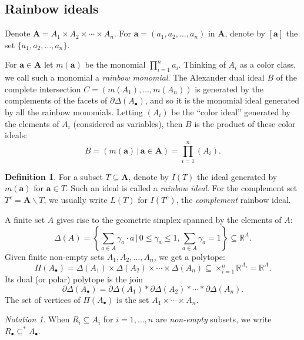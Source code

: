\documentclass[10pt,a4paper]{article}
\theoremstyle{definition}
\newtheorem{defi}[cdrthm]{Definition}
\theoremstyle{remark}
\newtheorem{nota}[cdrthm]{Notation}
\newcommand{\susst}{\subseteq^*}
\theoremstyle{plain}
\newcommand{\pd}{\partial}
\newcommand{\vardel}{\partial}
\newcommand{\sus}{\subseteq}
\newcommand{\bfa}{{\mathbf a}}
\newcommand{\RR}{{\mathbb R}}
\newcommand{\Ab}{A_\bullet}
\newcommand{\Rb}{R_\bullet}
\newcommand{\bfA}{{\mathbf A}}
\newcommand{\Delst}{\vardel \Delta}
\begin{document}
\setcounter{subsection}{1}

\subsection{Rainbow ideals}
Denote $\bfA = A_1 \times A_2 \times \cdots \times A_n$.
For $\bfa = (a_1, a_2, \ldots, a_n)$ in $\bfA$, denote
by $[\bfa ]$ the set $\{a_1, a_2, \ldots, a_n \}$. 

\setcounter{cdrthm}{1}

For $\bfa \in \bfA$ let $m(\bfa)$ be the monomial 
$\prod_{i = 1}^n a_i$. Thinking
of $A_i$ as a color class, we call such a monomial a {\it rainbow
monomial}.  The Alexander dual ideal $B$ of the complete intersection
$C = (m(A_1), \ldots, m(A_n))$ is generated by the complements
of the facets of $\Delst(\Ab)$, and so it is the monomial
ideal generated by all the  rainbow monomials. Letting
$(A_i)$ be the ``color ideal'' generated by the elements of $A_i$ (considered
as variables), then $B$ is the product of these color ideals:
\[ B  = (m(\bfa) \, | \, \bfa \in \bfA) = \prod_{i = 1}^n(A_i). \]

\begin{defi}
For a subset $T \sus \bfA$, denote by $I(T)$ the ideal generated
by $m(\bfa)$ for $\bfa \in T$. Such an ideal is called a {\it rainbow ideal}.
For the complement set $T^c = \bfA \backslash T$, we
usually write $L(T)$ for $I(T^c)$, the {\it complement} rainbow ideal.
\end{defi}

\setcounter{section}{5}\setcounter{subsection}{1}\setcounter{cdrthm}{0}\setcounter{equation}{6}\setcounter{figure}{5}

A finite set $A$ gives rise to the geometric
simplex spanned by the elements of $A$:
\[ \Delta(A) = \left\{\sum_{a \in A} \gamma_a \cdot a \, | \, 0 \leq \gamma_a \leq 1,  \sum_{a \in A} \gamma_a = 1 \right\} \sus \RR^A. \]
Given finite non-empty sets $ A_1, A_2, \ldots, A_n$, 
we get a polytope: 
\[ \Pi(\Ab) = \Delta(A_1) \times \Delta(A_2) \times \cdots
\times \Delta(A_n) \sus \times_{i = 1}^n \RR^{A_i} = \RR^A. \]
Its dual (or polar) polytope
is the join
\[ \Delst(\Ab) =  \pd \Delta(A_1) * \pd \Delta(A_2) * \cdots * \pd \Delta(A_n).
\]
The set of vertices of $\Pi(\Ab)$ is the set $A_1 \times \cdots \times
A_n$.

\begin{nota}
  When  $R_i \sus A_i$ for $ i = 1, \ldots, n$ are {\it non-empty} subsets,
  we write $\Rb \susst \Ab$.
\end{nota}
\end{document}
